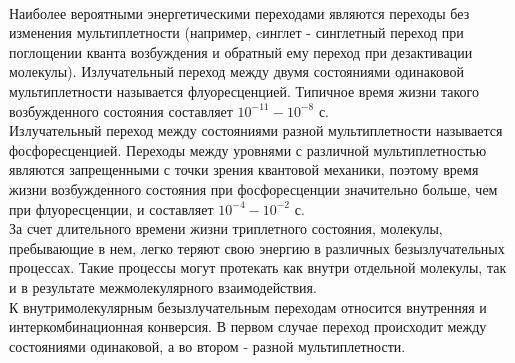 \documentclass[a4paper,12pt]{article}
\begin{document}
\\
Наиболее вероятными энергетическими переходами являются переходы без
изменения мультиплетности (например, cинглет - синглетный переход при
поглощении кванта возбуждения и обратный ему переход при дезактивации
молекулы). Излучательный переход между двумя состояниями одинаковой мультиплетности
называется флуоресценцией. Типичное время жизни такого возбужденного состояния
составляет $10^{-11}-10^{-8}$ с.
\\
Излучательный переход между состояниями разной мультиплетности называется
фосфоресценцией. Переходы между уровнями с различной мультиплетностью являются
запрещенными с точки зрения квантовой механики, поэтому время жизни возбужденного
состояния при фосфоресценции значительно больше, чем при флуоресценции, и составляет
$10^{-4}-10^{-2}$ с.
\\
За счет длительного времени жизни триплетного состояния, молекулы, пребывающие
в нем, легко теряют свою энергию в различных безызлучательных процессах. Такие
процессы могут протекать как внутри отдельной молекулы, так и в результате
межмолекулярного взаимодействия. 
\\
К внутримолекулярным безызлучательным переходам относится внутренняя и
интеркомбинационная конверсия. В первом случае переход происходит между
состояниями одинаковой, а во втором - разной мультиплетности.
\end{document}
